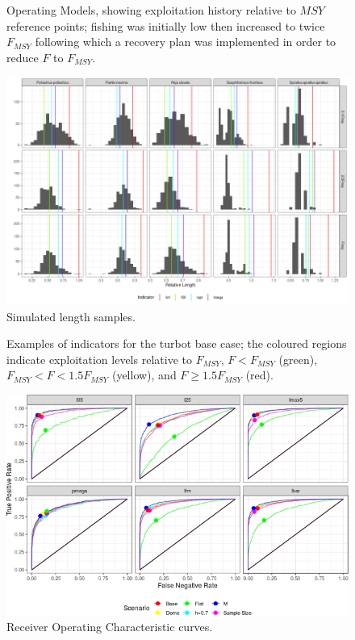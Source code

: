 \documentclass[12pt,doublespacing,a4paper]{ouparticle}
\begin{document}
\newpage
\begin{figure}[h]
\centering

\caption{Operating Models, showing exploitation history relative to $MSY$ reference points; fishing was initially low then increased to twice $F_{MSY}$ following which a recovery plan was implemented in order to reduce $F$ to $F_{MSY}$.}
\label{fig:oms}
\end{figure}



\newpage
\begin{figure}[h]
\centering
\includegraphics[width=\textwidth]{roc-lf-1.png}
\caption{Simulated length samples.}
\label{fig:samples}
\end{figure}

\newpage
\begin{figure}[h]
\centering

\caption{Examples of indicators for the turbot base case; the coloured regions indicate exploitation levels relative to $F_{MSY}$, $F<F_{MSY}$ (green),  $F_{MSY} <F< 1.5F_{MSY}$ (yellow), and $F \geq 1.5F_{MSY}$ (red).}
\label{fig:indicators}
\end{figure}


\newpage
\begin{figure}[h]
\centering
\includegraphics[width=\textwidth]{roc-overfish-roc-pollack-1.png}
\caption{Receiver Operating Characteristic curves.}
\label{fig:roc}
\end{figure}
\end{document}
